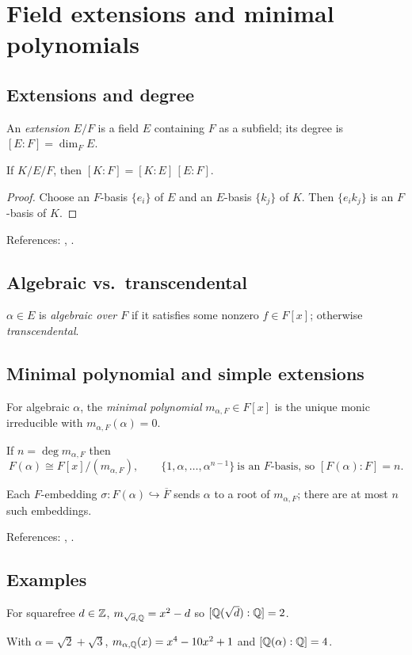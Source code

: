 \section{Field extensions and minimal polynomials}\label{sec:extensions-minimal}

\subsection{Extensions and degree}
\begin{definition}
An \emph{extension} $E/F$ is a field $E$ containing $F$ as a subfield; its degree is $[E\!:\!F]=\dim_F E$.
\end{definition}
\begin{theorem}\label{thm:tower}
If $K/E/F$, then $[K\!:\!F]=[K\!:\!E]\,[E\!:\!F]$.
\end{theorem}
\begin{proof}
Choose an $F$-basis $\{e_i\}$ of $E$ and an $E$-basis $\{k_j\}$ of $K$. Then $\{e_i k_j\}$ is an $F$-basis of $K$.
\end{proof}
References: \cite[\S13]{DF}, \cite[Ch.~V]{Artin}.

\subsection{Algebraic vs.\ transcendental}
\begin{definition}
$\alpha\in E$ is \emph{algebraic over $F$} if it satisfies some nonzero $f\in F[x]$; otherwise \emph{transcendental}.
\end{definition}

\subsection{Minimal polynomial and simple extensions}
\begin{definition}
For algebraic $\alpha$, the \emph{minimal polynomial} $m_{\alpha,F}\in F[x]$ is the unique monic irreducible with $m_{\alpha,F}(\alpha)=0$.
\end{definition}
\begin{proposition}[Structure]\label{prop:simple}
If $n=\deg m_{\alpha,F}$ then
\[
F(\alpha)\cong F[x]/(m_{\alpha,F}),\qquad
\{1,\alpha,\dots,\alpha^{n-1}\}\ \text{is an $F$-basis, so } [F(\alpha)\!:\!F]=n.
\]
\end{proposition}
\begin{remark}[Conjugates]
Each $F$-embedding $\sigma:F(\alpha)\hookrightarrow \overline{F}$ sends $\alpha$ to a root of $m_{\alpha,F}$; there are at most $n$ such embeddings.
\end{remark}
References: \cite[\S13--14]{DF}, \cite[Ch.~V]{Artin}.

\subsection{Examples}
\begin{example}
For squarefree $d\in\mathbb{Z}$, $m_{\sqrt d,\mathbb{Q}}=x^2-d$ so $[\mathbb{Q}(\sqrt d):\mathbb{Q}]=2$.
\end{example}
\begin{example}
With $\alpha=\sqrt2+\sqrt3$, $m_{\alpha,\mathbb{Q}}(x)=x^4-10x^2+1$ and $[\mathbb{Q}(\alpha):\mathbb{Q}]=4$.
\end{example}
